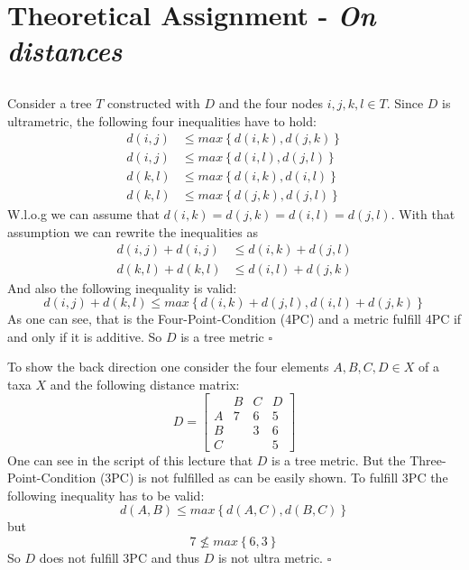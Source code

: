 \documentclass[%
   10pt,              %
   ngerman,           %
   a4paper,           %
   DIV11,             %
]{scrartcl}%
\begin{document}
\section{Theoretical Assignment - \textit{On distances}}
\subsection{}

Consider a tree $T$ constructed with $D$ and the four nodes $i,j,k,l \in T$. Since $D$ is ultrametric, 
the following four inequalities have to hold:
\begin{align}
 d(i,j) &\le max \left\lbrace d(i,k), d(j,k) \right\rbrace \nonumber \\
 d(i,j) &\le max \left\lbrace d(i,l), d(j,l) \right\rbrace \nonumber \\
 d(k,l) &\le max \left\lbrace d(i,k), d(i,l) \right\rbrace \nonumber \\
 d(k,l) &\le max \left\lbrace d(j,k), d(j,l) \right\rbrace \nonumber
\end{align}
W.l.o.g we can assume that $d(i,k) = d(j,k) = d(i,l) = d(j,l)$. With that assumption we can rewrite 
the inequalities as
\begin{align}
 d(i,j) + d(i,j) &\le d(i,k) + d(j,l) \nonumber \\
 d(k,l) + d(k,l) &\le d(i,l) + d(j,k) \nonumber
\end{align}
And also the following inequality is valid:
\begin{equation}
 d(i,j) + d(k,l) \le max \left\lbrace d(i,k) + d(j,l), d(i,l) + d(j,k) \right\rbrace \nonumber
\end{equation}
As one can see, that is the Four-Point-Condition (4PC) and a metric fulfill 4PC if and only if it is 
additive. So $D$ is a tree metric $\square$

To show the back direction one consider the four elements $A, B, C, D \in X$ of a taxa $X$ and the 
following distance matrix:
\begin{equation}
 D = \begin{bmatrix}
        & B & C & D \\
      A & 7 & 6 & 5 \\
      B &   & 3 & 6 \\
      C &   &   & 5
     \end{bmatrix} \nonumber
\end{equation}
One can see in the script of this lecture that $D$ is a tree metric. But the Three-Point-Condition 
(3PC) is not fulfilled as can be easily shown. To fulfill 3PC the following inequality has to be 
valid:
\begin{equation}
 d(A,B) \le max \left\lbrace d(A,C), d(B,C) \right\rbrace \nonumber
\end{equation}
but
\begin{equation}
 7 \nleq max \left\lbrace 6, 3  \right\rbrace \nonumber
\end{equation}
So $D$ does not fulfill 3PC and thus $D$ is not ultra metric. $\square$
\end{document}
